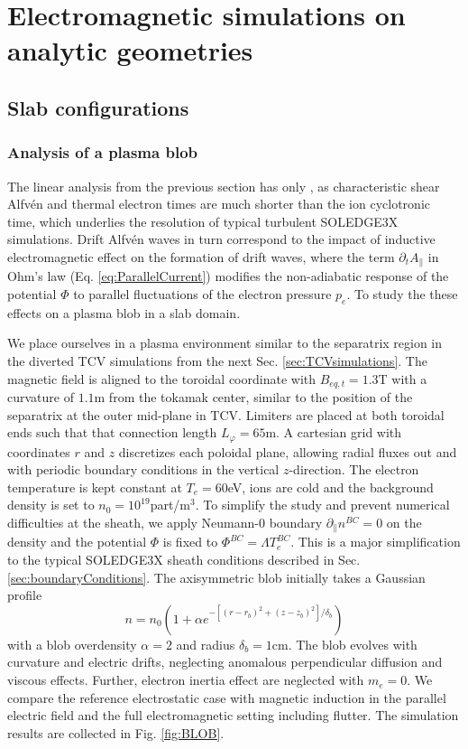 \chapter{Electromagnetic simulations on analytic geometries}

\section{Slab configurations}
\subsection{Analysis of a plasma blob}
\label{ssec:plasmablob}

The linear analysis from the previous section has only , as characteristic shear Alfvén and thermal electron times are much shorter than the ion cyclotronic time, which underlies the resolution of typical turbulent SOLEDGE3X simulations. Drift Alfvén waves in turn correspond to the impact of inductive electromagnetic effect on the formation of drift waves, where the term $\partial_t A_\parallel$ in Ohm's law (Eq. \ref{eq:ParallelCurrent}) modifies the non-adiabatic response of the potential $\Phi$ to parallel fluctuations of the electron pressure $p_e$. To study the these effects on a plasma blob in a slab domain. \newline

We place ourselves in a plasma environment similar to the separatrix region in the diverted TCV simulations from the next Sec. \ref{sec:TCVsimulations}. The magnetic field is aligned to the toroidal coordinate with $B_{eq,t} = 1.3$T with a curvature of $1.1$m from the tokamak center, similar to the position of the separatrix at the outer mid-plane in TCV. Limiters are placed at both toroidal ends such that that connection length $L_\varphi = 65$m. A cartesian grid with coordinates $r$ and $z$ discretizes each poloidal plane, allowing radial fluxes out and with periodic boundary conditions in the vertical $z$-direction. The electron temperature is kept constant at $T_e=60$eV, ions are cold and the background density is set to $n_0 = 10^{19}$part/m$^3$. To simplify the study and prevent numerical difficulties at the sheath, we apply Neumann-0 boundary $\partial_\parallel n^{BC} = 0$ on the density and the potential $\Phi$ is fixed to $\Phi^{BC} = \Lambda T_e^{BC}$. This is a major simplification to the typical SOLEDGE3X sheath conditions described in Sec. \ref{sec:boundaryConditions}. The axisymmetric blob initially takes a Gaussian profile 
\begin{equation}
	n = n_0 \left(1 + \alpha e^{-\left[(r-r_b)^2+(z-z_b)^2\right]/\delta_b}\right)
	\label{eq:blobInitProfile}
\end{equation}
with a blob overdensity $\alpha = 2$ and radius $\delta_b = 1$cm. The blob evolves with curvature and electric drifts, neglecting anomalous perpendicular diffusion and viscous effects. Further, electron inertia effect are neglected with $m_e = 0$. We compare the reference electrostatic case with magnetic induction in the parallel electric field and the full electromagnetic setting including flutter. The simulation results are collected in Fig. \ref{fig:BLOB}. \newline

